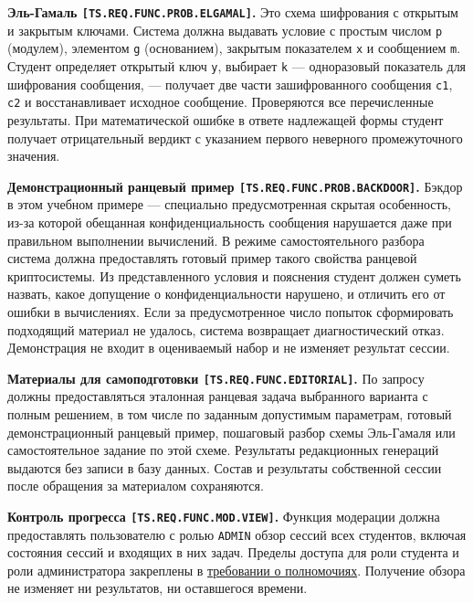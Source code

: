 \documentclass[12pt,a4paper]{article}
\begin{document}
\hypertarget{ts-req-func-prob-elgamal}{} \textbf{Эль-Гамаль \texttt{[TS.\allowbreak{}REQ.\allowbreak{}FUNC.\allowbreak{}PROB.\allowbreak{}ELGAMAL]}.} Это схема шифрования с открытым и закрытым ключами. Система должна выдавать условие с простым числом \texttt{p} (модулем), элементом \texttt{g} (основанием), закрытым показателем \texttt{x} и сообщением \texttt{m}. Студент определяет открытый ключ \texttt{y}, выбирает \texttt{k} --- одноразовый показатель для шифрования сообщения, --- получает две части зашифрованного сообщения \texttt{c1}, \texttt{c2} и восстанавливает исходное сообщение. Проверяются все перечисленные результаты. При математической ошибке в ответе надлежащей формы студент получает отрицательный вердикт с указанием первого неверного промежуточного значения.

\hypertarget{ts-req-func-prob-backdoor}{} \textbf{Демонстрационный ранцевый пример \texttt{[TS.\allowbreak{}REQ.\allowbreak{}FUNC.\allowbreak{}PROB.\allowbreak{}BACKDOOR]}.} Бэкдор в этом учебном примере --- специально предусмотренная скрытая особенность, из-за которой обещанная конфиденциальность сообщения нарушается даже при правильном выполнении вычислений. В режиме самостоятельного разбора система должна предоставлять готовый пример такого свойства ранцевой криптосистемы. Из представленного условия и пояснения студент должен суметь назвать, какое допущение о конфиденциальности нарушено, и отличить его от ошибки в вычислениях. Если за предусмотренное число попыток сформировать подходящий материал не удалось, система возвращает диагностический отказ. Демонстрация не входит в оцениваемый набор и не изменяет результат сессии.

\hypertarget{ts-req-func-editorial}{} \textbf{Материалы для самоподготовки \texttt{[TS.\allowbreak{}REQ.\allowbreak{}FUNC.\allowbreak{}EDITORIAL]}.} По запросу должны предоставляться эталонная ранцевая задача выбранного варианта с полным решением, в том числе по заданным допустимым параметрам, готовый демонстрационный ранцевый пример, пошаговый разбор схемы Эль-Гамаля или самостоятельное задание по этой схеме. Результаты редакционных генераций выдаются без записи в базу данных. Состав и результаты собственной сессии после обращения за материалом сохраняются.

\hypertarget{ts-req-func-mod-view}{} \textbf{Контроль прогресса \texttt{[TS.\allowbreak{}REQ.\allowbreak{}FUNC.\allowbreak{}MOD.\allowbreak{}VIEW]}.} Функция модерации должна предоставлять пользователю с ролью \texttt{ADMIN} обзор сессий всех студентов, включая состояния сессий и входящих в них задач. Пределы доступа для роли студента и роли администратора закреплены в {\hyperlink{ts-req-sec-roles}{требовании о полномочиях}}. Получение обзора не изменяет ни результатов, ни оставшегося времени.
\end{document}
